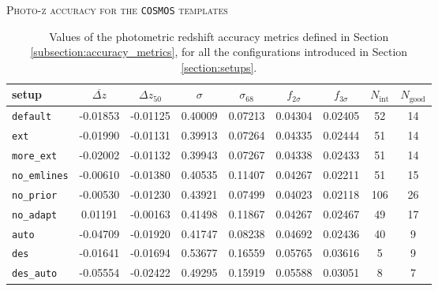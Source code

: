 \begin{table}[hb]
\centering
\normalsize
\textsc{Photo-z accuracy for the \texttt{COSMOS} templates} \\
\vspace{0.1em}
\footnotesize
\begin{tabular}{lcccccccc}
\toprule\toprule
setup & $\overbar{\Delta z}$ & $\Delta z_{50}$ & $\sigma$ & $\sigma_{68}$ &  $f_{2\sigma}$ & $f_{3\sigma}$ & $N_{\mathrm{int}}$ & $N_{\mathrm{good}}$\\
\midrule
\texttt{default} & -0.01853 & -0.01125 & 0.40009 & 0.07213 & 0.04304 & 0.02405 & 52 & 14 \\
\texttt{ext} & -0.01990 & -0.01131 & 0.39913 & 0.07264 & 0.04335 & 0.02444 & 51 & 14 \\
\texttt{more\_ext} & -0.02002 & -0.01132 & 0.39943 & 0.07267 & 0.04338 & 0.02433 & 51 & 14 \\
\texttt{no\_emlines} & -0.00610 & -0.01380 & 0.40535 & 0.11407 & 0.04267 & 0.02211 & 51 & 15 \\
\texttt{no\_prior} & -0.00530 & -0.01230 & 0.43921 & 0.07499 & 0.04023 & 0.02118 & 106 & 26 \\
\texttt{no\_adapt} & 0.01191 & -0.00163 & 0.41498 & 0.11867 & 0.04267 & 0.02467 & 49 & 17 \\
\texttt{auto} & -0.04709 & -0.01920 & 0.41747 & 0.08238 & 0.04692 & 0.02436 & 40 & 9 \\
\texttt{des} & -0.01641 & -0.01694 & 0.53677 & 0.16559 & 0.05765 & 0.03616 & 5 & 9 \\
\texttt{des\_auto} & -0.05554 & -0.02422 & 0.49295 & 0.15919 & 0.05588 & 0.03051 & 8 & 7 \\
\bottomrule
\end{tabular}
\vspace{1em}
\caption[Photometric accuracy test results]{Values of the photometric redshift accuracy metrics defined in Section \ref{subsection:accuracy_metrics}, for all the configurations introduced in Section \ref{section:setups}.}\label{table:photoz_test}

\end{table}


